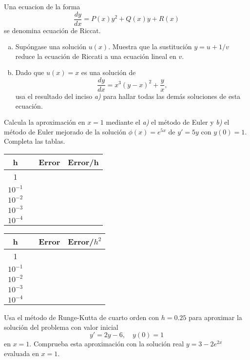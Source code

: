 \documentclass[12pt]{exam}
\begin{document}
\begin{questions}
     \question
     Una ecuacion de la forma $$\frac{dy}{dx}=P(x)y^2+Q(x)y+R(x)$$ se denomina ecuación de Riccat.
     \begin{enumerate}[a)]
     		\item Supóngase una solución $u(x)$. Muestra que la sustitución $y=u+1/v$ reduce la ecuación de Riccati a una ecuación lineal en $v$.
            \item Dado que $u(x)=x$ es una solución de $$\frac{dy}{dx}=x^3(y-x)^2+\frac{y}{x},$$ usa el resultado del inciso \textit{a)} para hallar todas las demás soluciones de esta ecuación.
     \end{enumerate}

     \question
     Calcula la aproximación en $x=1$ 
     mediante el \textit{a)} el método de Euler y \textit{b)} el método de Euler mejorado de la solución $\phi(x)=e^{5x}$ de $y'=5y$ con $y(0)=1$. Completa las tablas.
    
    \small
     \begin{tabular}{cm{2.5cm}cc}
     \hline
     h&\centering{Aproximación de Euler}&Error&Error/h\\
     \hline
     1\\
     $10^{-1}$\\
     $10^{-2}$\\
     $10^{-3}$\\
     $10^{-4}$\\
     \hline
     \end{tabular}
     \begin{tabular}{cm{3cm}cc}
     \hline
     h&\centering{Aproximación de Euler mejorado}&Error&Error/$h^2$\\
     \hline
     1\\
     $10^{-1}$\\
     $10^{-2}$\\
     $10^{-3}$\\
     $10^{-4}$\\
     \hline
     \end{tabular}
     
  
     

     \question
     Usa el método de Runge-Kutta de cuarto orden con $h=0.25$ para aproximar la solución del problema con valor inicial $$y'=2y-6,\quad y(0)=1$$ en $x=1$. Comprueba esta aproximación con la solución real $y=3-2e^{2x}$ evaluada en $x=1$.

        \end{questions}
        \vskip30pt
\end{document}
